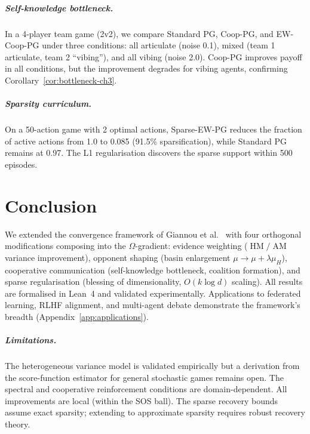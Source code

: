 \documentclass[a4paper,oneside,11pt]{report}
\begin{document}
\paragraph{Self-knowledge bottleneck.} In a 4-player team game (2v2), we compare Standard PG, Coop-PG, and EW-Coop-PG under three conditions: all articulate (noise 0.1), mixed (team 1 articulate, team 2 ``vibing''), and all vibing (noise 2.0). Coop-PG improves payoff in all conditions, but the improvement degrades for vibing agents, confirming Corollary~\ref{cor:bottleneck-ch3}.

\paragraph{Sparsity curriculum.} On a 50-action game with 2 optimal actions, Sparse-EW-PG reduces the fraction of active actions from 1.0 to 0.085 (91.5\% sparsification), while Standard PG remains at 0.97. The L1 regularisation discovers the sparse support within 500 episodes.


\chapter{Conclusion}
\label{ch:conclusion}

We extended the convergence framework of Giannou et al.~\cite{giannou2022} with four orthogonal modifications composing into the $\Omega$-gradient: evidence weighting ($\operatorname{HM}/\operatorname{AM}$ variance improvement), opponent shaping (basin enlargement $\mu \to \mu + \lambda\mu_H$), cooperative communication (self-knowledge bottleneck, coalition formation), and sparse regularisation (blessing of dimensionality, $O(k \log d)$ scaling). All results are formalised in Lean~4 and validated experimentally. Applications to federated learning, RLHF alignment, and multi-agent debate demonstrate the framework's breadth (Appendix~\ref{app:applications}).

\paragraph{Limitations.} The heterogeneous variance model is validated empirically but a derivation from the score-function estimator for general stochastic games remains open. The spectral and cooperative reinforcement conditions are domain-dependent. All improvements are local (within the SOS ball). The sparse recovery bounds assume exact sparsity; extending to approximate sparsity requires robust recovery theory.
\end{document}
